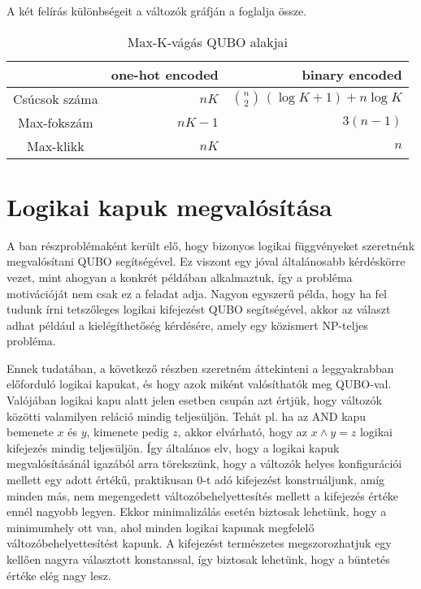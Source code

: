 A két felírás különbségeit a változók gráfján a  foglalja össze.


\begin{table}[ht]
	\footnotesize
	\centering
	\begin{tabular}{ c r r }
		\toprule
		  & one-hot encoded & binary encoded \\
		\midrule
		Csúcsok száma  & $n K$     & $\binom{n}{2} \, ( \log K + 1 ) + n \log K$ \\
		Max-fokszám    & $n K - 1 $ & $3(n-1)$ \\
		Max-klikk      & $n K$     & $n$ \\		
		\bottomrule
	\end{tabular}
	\caption{Max-K-vágás QUBO alakjai}
	\label{tab:diffMaxKCutFormulas}
\end{table}

  

\section{Logikai kapuk megvalósítása}\label{sec:theoryLogicalGates}

A ban részproblémaként került elő, hogy bizonyos logikai függvényeket szeretnénk megvalósítani QUBO segítségével. Ez viszont egy jóval általánosabb kérdéskörre vezet, mint ahogyan a konkrét példában alkalmaztuk, így a probléma motivációját nem csak ez a feladat adja. Nagyon egyszerű példa, hogy ha fel tudunk írni tetszőleges logikai kifejezést QUBO segítségével, akkor az választ adhat például a kielégíthetőség kérdésére, amely egy közismert NP-teljes probléma\cite{algoritmusokBook}.

Ennek tudatában, a következő részben szeretném áttekinteni a leggyakrabban előforduló logikai kapukat, és hogy azok miként valósíthatók meg QUBO-val. Valójában logikai kapu alatt jelen esetben csupán azt értjük, hogy változók közötti valamilyen reláció mindig teljesüljön. Tehát pl. ha az AND kapu bemenete $x$ és $y$, kimenete pedig $z$, akkor elvárható, hogy az $x \wedge y = z$ logikai kifejezés mindig teljesüljön. Így általános elv, hogy a logikai kapuk megvalósításánál igazából arra törekszünk, hogy a változók helyes konfigurációi mellett egy adott értékű, praktikusan 0-t adó kifejezést konstruáljunk, amíg minden más, nem megengedett változóbehelyettesítés mellett a kifejezés értéke ennél nagyobb legyen. Ekkor minimalizálás esetén biztosak lehetünk, hogy a minimumhely ott van, ahol minden logikai kapunak megfelelő változóbehelyettesítést kapunk. A kifejezést természetes megszorozhatjuk egy kellően nagyra választott konstanssal, így biztosak lehetünk, hogy a büntetés értéke elég nagy lesz.

